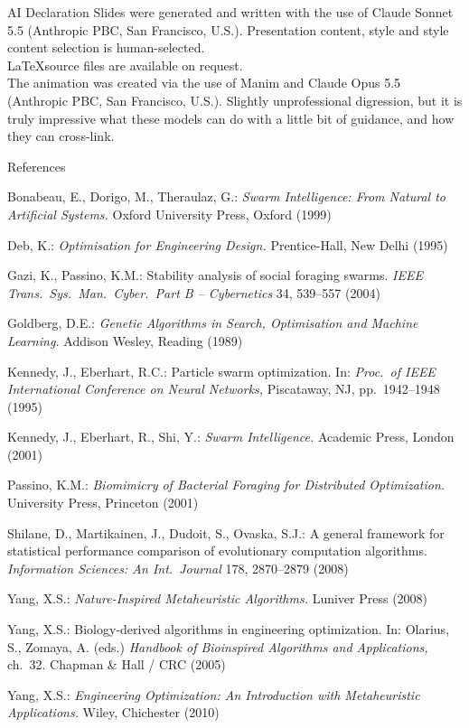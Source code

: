 \documentclass[aspectratio=169,11pt]{beamer}
\newcommand{\hdr}[1]{\gdef\curhdr{#1}}
\gdef\curhdr{}
\begin{document}
\hdr{AI Declaration}
\begin{frame}[t]{AI Declaration}
\small
Slides were generated and written with the use of Claude Sonnet 5.5 (Anthropic PBC, San Francisco, U.S.). Presentation content, style and style content selection is human-selected. \\
\LaTeX source files are available on request. \\
The animation was created via the use of Manim and Claude Opus 5.5 (Anthropic PBC, San Francisco, U.S.). Slightly unprofessional digression, but it is truly impressive what these models can do
with a little bit of guidance, and how they can cross-link.
\end{frame}

\hdr{References}
\begin{frame}[t]{References}
\scriptsize
\begin{list}{}{\setlength{\leftmargin}{2.2em}\setlength{\itemindent}{-2.2em}\setlength{\itemsep}{0.05em}\setlength{\topsep}{0pt}}
\item[] [1] Bonabeau, E., Dorigo, M., Theraulaz, G.: \emph{Swarm Intelligence: From Natural to Artificial Systems.} Oxford University Press, Oxford (1999)
\item[] [2] Deb, K.: \emph{Optimisation for Engineering Design.} Prentice-Hall, New Delhi (1995)
\item[] [3] Gazi, K., Passino, K.M.: Stability analysis of social foraging swarms. \emph{IEEE Trans.\ Sys.\ Man.\ Cyber.\ Part B -- Cybernetics} 34, 539--557 (2004)
\item[] [4] Goldberg, D.E.: \emph{Genetic Algorithms in Search, Optimisation and Machine Learning.} Addison Wesley, Reading (1989)
\item[] [5] Kennedy, J., Eberhart, R.C.: Particle swarm optimization. In: \emph{Proc.\ of IEEE International Conference on Neural Networks,} Piscataway, NJ, pp.\ 1942--1948 (1995)
\item[] [6] Kennedy, J., Eberhart, R., Shi, Y.: \emph{Swarm Intelligence.} Academic Press, London (2001)
\item[] [7] Passino, K.M.: \emph{Biomimicry of Bacterial Foraging for Distributed Optimization.} University Press, Princeton (2001)
\item[] [8] Shilane, D., Martikainen, J., Dudoit, S., Ovaska, S.J.: A general framework for statistical performance comparison of evolutionary computation algorithms. \emph{Information Sciences: An Int.\ Journal} 178, 2870--2879 (2008)
\item[] [9] Yang, X.S.: \emph{Nature-Inspired Metaheuristic Algorithms.} Luniver Press (2008)
\item[] [10] Yang, X.S.: Biology-derived algorithms in engineering optimization. In: Olarius, S., Zomaya, A. (eds.) \emph{Handbook of Bioinspired Algorithms and Applications,} ch.\ 32. Chapman \& Hall / CRC (2005)
\item[] [11] Yang, X.S.: \emph{Engineering Optimization: An Introduction with Metaheuristic Applications.} Wiley, Chichester (2010)
\end{list}
\end{frame}
\end{document}
